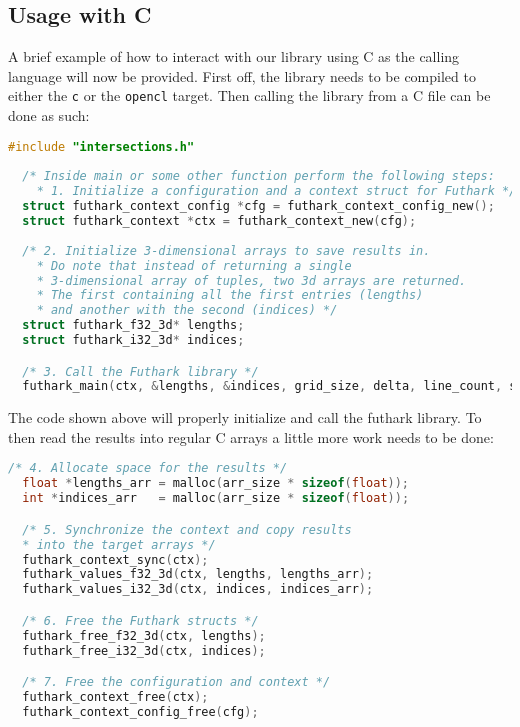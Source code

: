\begin{appendices}
    \subsection*{Usage with C}
    A brief example of how to interact with our library using C as the calling language will now be provided.
    First off, the library needs to be compiled to either the \texttt{c} or the \texttt{opencl} target. Then calling the library from a C file can be done as such:
    \begin{simplebox}
        \begin{lstlisting}[language=C]
  #include "intersections.h"
  
  /* Inside main or some other function perform the following steps:
    * 1. Initialize a configuration and a context struct for Futhark */
  struct futhark_context_config *cfg = futhark_context_config_new();
  struct futhark_context *ctx = futhark_context_new(cfg);
  
  /* 2. Initialize 3-dimensional arrays to save results in. 
    * Do note that instead of returning a single 
    * 3-dimensional array of tuples, two 3d arrays are returned. 
    * The first containing all the first entries (lengths)
    * and another with the second (indices) */
  struct futhark_f32_3d* lengths;
  struct futhark_i32_3d* indices;

  /* 3. Call the Futhark library */
  futhark_main(ctx, &lengths, &indices, grid_size, delta, line_count, scan_start, scan_end, scan_step);
        \end{lstlisting}
    \end{simplebox}
    The code shown above will properly initialize and call the futhark library. To then read the results into regular C arrays a little more work needs to be done: 
    \begin{simplebox}
        \begin{lstlisting}[language=C]
  /* 4. Allocate space for the results */
  float *lengths_arr = malloc(arr_size * sizeof(float));
  int *indices_arr   = malloc(arr_size * sizeof(float));  

  /* 5. Synchronize the context and copy results 
  * into the target arrays */
  futhark_context_sync(ctx);
  futhark_values_f32_3d(ctx, lengths, lengths_arr);
  futhark_values_i32_3d(ctx, indices, indices_arr);  

  /* 6. Free the Futhark structs */
  futhark_free_f32_3d(ctx, lengths);
  futhark_free_i32_3d(ctx, indices);

  /* 7. Free the configuration and context */
  futhark_context_free(ctx);
  futhark_context_config_free(cfg);


\end{lstlisting}
\end{simplebox}
\end{appendices}
